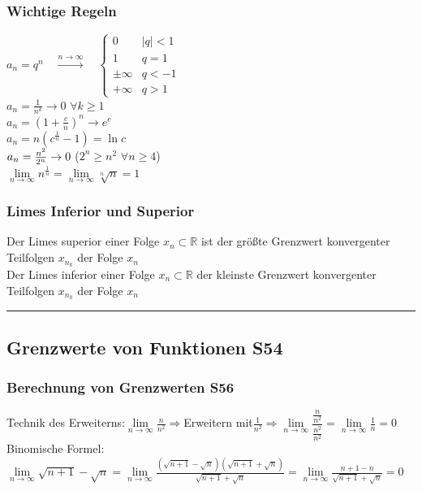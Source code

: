\subsubsection{Wichtige Regeln}
$a_n=q^n \quad \overset{n \rightarrow \infty}{\longrightarrow} \quad \begin{cases} 0 & |q|<1 \\ 1 & q=1 \\ \pm \infty & q < -1  \\  + \infty & q > 1\end{cases}$ \\
$a_n=\frac{1}{n^k}\rightarrow 0$ \qquad $\forall k \ge 1$\\
$a_n=\left(1+\frac{c}{n}\right)^n \rightarrow e^c$ \\
$a_n=n\left(c^{\frac1{n}}-1\right) = \ln c$\\
$a_n=\frac{n^2}{2^n}\rightarrow 0$ \qquad \qquad \qquad ($2^n \ge n^2$ \quad $\forall n\ge 4$) \\
$\lim\limits_{n\to\infty}n^{\frac{1}{n}}=\lim\limits_{n\to\infty}\sqrt[n]{n}=1$


\subsubsection{Limes Inferior und Superior}
Der Limes superior einer Folge $x_n \subset \mathbb{R}$ ist der größte Grenzwert konvergenter Teilfolgen $x_{n_k}$ der Folge ${x_n}$ \\
Der Limes inferior einer Folge $x_n \subset \mathbb{R}$ der kleinste Grenzwert konvergenter Teilfolgen $x_{n_k}$ der Folge $x_n$
\hrule
\subsection{Grenzwerte von Funktionen \color{red} S54}
\subsubsection{Berechnung von Grenzwerten \color{red}S56} 
Technik des Erweiterns:$\lim\limits_{n\to \infty} \frac{n}{n^{2}}\Rightarrow $Erweitern mit$\frac{1}{n^{2}} \Rightarrow \lim\limits_{n\to \infty} \dfrac{\frac{n}{n^{2}}}{\frac{n^{2}}{n^{2}}} =\lim\limits_{n\to \infty}\frac{1}{n}=0$\\
Binomische Formel: $ \lim\limits_{n\to \infty}\sqrt{n+1}-\sqrt{n}= \lim\limits_{n\to \infty}\frac{(\sqrt{n+1}-\sqrt{n})(\sqrt{n+1}+\sqrt{n})}{\sqrt{n+1}+\sqrt{n}}=  
\lim\limits_{n\to \infty}\frac{n+1-n}{\sqrt{n+1}+\sqrt{n}}= 0$


